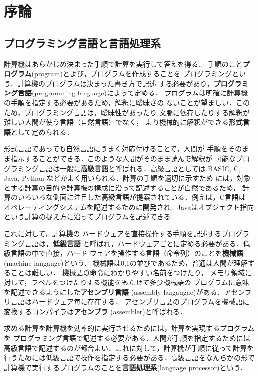 \documentclass[a4j,dvipdfmx]{jbook}
\begin{document}
\chapter{序論}
\section{プログラミング言語と言語処理系}
計算機はあらかじめ決まった手順で計算を実行して答えを得る．
手順のこと{\bf プログラム}(program)とよび，プログラムを作成することを
プログラミングという．計算機のプログラムは決まった書き方で記述
する必要があり，{\bf プログラミング言語}(programming language)によって定める．
プログラムは明確に計算機の手順を指定する必要があるため，解釈に曖昧さの
ないことが望ましい．このため，プログラミング言語は，曖昧性があったり
文脈に依存したりする解釈が難しい人間が使う言語（自然言語）でなく，
より機械的に解釈ができる{\bf 形式言語}として定められる．

形式言語であっても自然言語にうまく対応付けることで，人間が
手順をそのまま指示することができる．このような人間がそのまま読んで解釈が
可能なプログラミング言語は一般に{\bf 高級言語}と呼ばれる．高級言語としては
BASIC, C, Java, Python などがよく用いられる．計算の手順を適切に示すため
には，対象とする計算の目的や計算機の構成に沿って記述することが自然であるため，
計算のいろいろな側面に注目した高級言語が提案されている．例えば，C言語は
オペレーティングシステムを記述するために開発され，Javaはオブジェクト指向
という計算の捉え方に沿ってプログラムを記述できる．

これに対して，計算機の
ハードウェアを直接操作する手順を記述するプログラミング言語は，{\bf 低級言語}
と呼ばれ，ハードウェアごとに定める必要がある．低級言語の中で直接，ハード
ウェアを操作する言語（命令列）のことを{\bf 機械語}(machine langauge)という．
機械語は0,1の並びであるため，普通は人間が理解することは難しい．
機械語の命令にわかりやすい名前をつけたり，
メモリ領域に対して，ラベルをつけたりする機能をもたせて多少機械語の
プログラムに意味を記述できるようにした{\bf アセンブリ言語}
(assembly langaugae)がある．アセンブリ言語はハードウェア毎に存在する．
アセンブリ言語のプログラムを機械語に変換するコンパイラは{\bf アセンブラ}
(assembler)と呼ばれる．

求める計算を計算機を効率的に実行させるためには，計算を実現するプログラムを
プログラミング言語で記述する必要がある．人間が手順を指定するためには
高級言語で記述するのが都合よい．これに対して，計算機が手順に従って計算を
行うためには低級言語で操作を指定する必要がある．高級言語をなんらかの形で
計算機で実行するプログラムのことを{\bf 言語処理系}(language processor)という．
\end{document}

